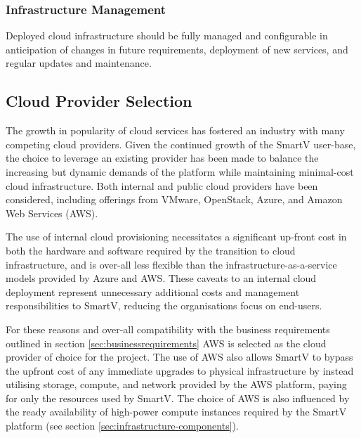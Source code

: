 \subsubsection*{Infrastructure Management}

Deployed cloud infrastructure should be fully managed and configurable in anticipation of changes in future requirements, deployment of new services, and regular updates and maintenance.


\subsection{Cloud Provider Selection}
The growth in popularity of cloud services has fostered an industry with many competing cloud providers. Given the continued growth of the SmartV user-base, the choice to leverage an existing provider has been made to balance the increasing but dynamic demands of the platform while maintaining minimal-cost cloud infrastructure. Both internal and public cloud providers have been considered, including offerings from VMware, OpenStack, Azure, and Amazon Web Services (AWS).

The use of internal cloud provisioning necessitates a significant up-front cost in both the hardware and software required by the transition to cloud infrastructure, and is over-all less flexible than the infrastructure-as-a-service models provided by Azure and AWS. These caveats to an internal cloud deployment represent unnecessary additional costs and management responsibilities to SmartV, reducing the organisations focus on end-users.

For these reasons and over-all compatibility with the business requirements outlined in section \ref{sec:businessrequirements} AWS is selected as the cloud provider of choice for the project. The use of AWS also allows SmartV to bypass the upfront cost of any immediate upgrades to physical infrastructure by instead utilising storage, compute, and network provided by the AWS platform, paying for only the resources used by SmartV. The choice of AWS is also influenced by the ready availability of high-power compute instances required by the SmartV platform (see section \ref{sec:infrastructure-components}).

